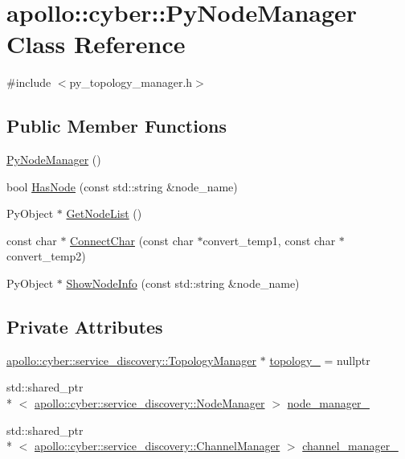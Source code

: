 \hypertarget{classapollo_1_1cyber_1_1PyNodeManager}{\section{apollo\-:\-:cyber\-:\-:Py\-Node\-Manager Class Reference}
\label{classapollo_1_1cyber_1_1PyNodeManager}
}


{\ttfamily \#include $<$py\-\_\-topology\-\_\-manager.\-h$>$}

\subsection*{Public Member Functions}
\begin{DoxyCompactItemize}
\item 
\hyperlink{classapollo_1_1cyber_1_1PyNodeManager_a892d62ca98912c5ae56fc81514a832d9}{Py\-Node\-Manager} ()
\item 
bool \hyperlink{classapollo_1_1cyber_1_1PyNodeManager_ab2053777715d03544004689de37295e9}{Has\-Node} (const std\-::string \&node\-\_\-name)
\item 
Py\-Object $\ast$ \hyperlink{classapollo_1_1cyber_1_1PyNodeManager_a3e63d327c299ce691eaaabca5efc975f}{Get\-Node\-List} ()
\item 
const char $\ast$ \hyperlink{classapollo_1_1cyber_1_1PyNodeManager_a04aa85c18ba9cb02de34cfd9a1c90694}{Connect\-Char} (const char $\ast$convert\-\_\-temp1, const char $\ast$convert\-\_\-temp2)
\item 
Py\-Object $\ast$ \hyperlink{classapollo_1_1cyber_1_1PyNodeManager_ae11d574bd9a4c24528eb9e0d0946f74b}{Show\-Node\-Info} (const std\-::string \&node\-\_\-name)
\end{DoxyCompactItemize}
\subsection*{Private Attributes}
\begin{DoxyCompactItemize}
\item 
\hyperlink{classapollo_1_1cyber_1_1service__discovery_1_1TopologyManager}{apollo\-::cyber\-::service\-\_\-discovery\-::\-Topology\-Manager} $\ast$ \hyperlink{classapollo_1_1cyber_1_1PyNodeManager_ab72b315e5e7a19954bbd5f4e27a347d6}{topology\-\_\-} = nullptr
\item 
std\-::shared\-\_\-ptr\\*
$<$ \hyperlink{classapollo_1_1cyber_1_1service__discovery_1_1NodeManager}{apollo\-::cyber\-::service\-\_\-discovery\-::\-Node\-Manager} $>$ \hyperlink{classapollo_1_1cyber_1_1PyNodeManager_a57c79a8bbc1471e37a605558acd8e949}{node\-\_\-manager\-\_\-}
\item 
std\-::shared\-\_\-ptr\\*
$<$ \hyperlink{classapollo_1_1cyber_1_1service__discovery_1_1ChannelManager}{apollo\-::cyber\-::service\-\_\-discovery\-::\-Channel\-Manager} $>$ \hyperlink{classapollo_1_1cyber_1_1PyNodeManager_a45882a06e6b80f7f5125aba07c7d61ca}{channel\-\_\-manager\-\_\-}
\end{DoxyCompactItemize}


